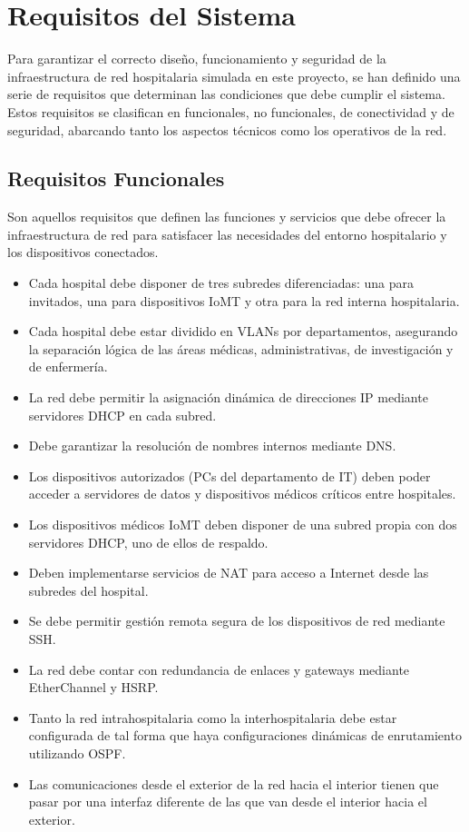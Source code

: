 \section{Requisitos del Sistema}
Para garantizar el correcto diseño, funcionamiento y seguridad de la infraestructura de red hospitalaria simulada en este proyecto, se han definido una serie de requisitos 
que determinan las condiciones que debe cumplir el sistema. Estos requisitos se clasifican en funcionales, no funcionales, de conectividad y de seguridad, abarcando tanto 
los aspectos técnicos como los operativos de la red.

\subsection{Requisitos Funcionales}
Son aquellos requisitos que definen las funciones y servicios que debe ofrecer la infraestructura de red para satisfacer las necesidades del entorno hospitalario y los 
dispositivos conectados.
\begin{itemize}
    \item Cada hospital debe disponer de tres subredes diferenciadas: una para invitados, una para dispositivos IoMT y otra para la red interna hospitalaria.
    \item Cada hospital debe estar dividido en VLANs por departamentos, asegurando la separación lógica de las áreas médicas, administrativas, de investigación y de enfermería.
    \item La red debe permitir la asignación dinámica de direcciones IP mediante servidores DHCP en cada subred.
    \item Debe garantizar la resolución de nombres internos mediante DNS.
    \item Los dispositivos autorizados (\ac{PC}s del departamento de IT) deben poder acceder a servidores de datos y dispositivos médicos críticos entre hospitales.
    \item Los dispositivos médicos IoMT deben disponer de una subred propia con dos servidores DHCP, uno de ellos de respaldo.
    \item Deben implementarse servicios de NAT para acceso a Internet desde las subredes del hospital.
    \item Se debe permitir gestión remota segura de los dispositivos de red mediante SSH.
    \item La red debe contar con redundancia de enlaces y gateways mediante EtherChannel y HSRP.
    \item Tanto la red intrahospitalaria como la interhospitalaria debe estar configurada de tal forma que haya configuraciones dinámicas de enrutamiento utilizando OSPF.
    \item Las comunicaciones desde el exterior de la red hacia el interior tienen que pasar por una interfaz diferente de las que van desde el interior hacia el exterior.
\end{itemize}
